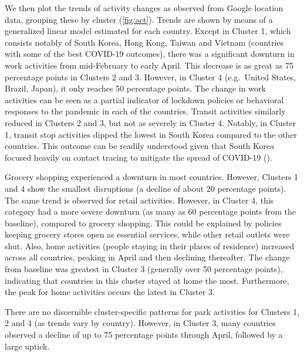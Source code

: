\documentclass[titlepage,oneside,12pt]{article}
\newcommand{\trbcite}[1]{({\it \citenum{#1}})}
\newcommand{\?}{\stackrel{?}{=}}
\begin{document}
We then plot the trends of activity changes as observed from Google location data, grouping these by cluster (\autoref{fig:act}).
Trends are shown by means of a generalized linear model estimated for each country.
Except in Cluster 1, which consists notably of South Korea, Hong Kong, Taiwan and Vietnam (countries with some of the best COVID-19 outcomes),
there was a significant downturn in work activities from mid-February to early April.
This decrease is as great as 75 percentage points in Clusters 2 and 3.
However, in Cluster 4 (e.g.\ United States, Brazil, Japan), it only reaches 50 percentage points.
The change in work activities can be seen as a partial indicator of lockdown policies or behavioral responses to the pandemic in each of the countries.
Transit activities similarly reduced in Clusters 2 and 3, but not as severely in Cluster 4.
Notably, in Cluster 1, transit stop activities dipped the lowest in South Korea compared to the other countries.
This outcome can be readily understood given that South Korea focused heavily on contact tracing to mitigate the spread of COVID-19 \trbcite{aum2020covid19,parkearly}.

Grocery shopping experienced a downturn in most countries. However, Clusters 1 and 4 show the smallest disruptions (a decline of about 20 percentage points).
The same trend is observed for retail activities.
However, in Cluster 4, this category had a more severe downturn (as many as 60 percentage points from the baseline), compared to grocery shopping.
This could be explained by policies keeping grocery stores open as essential services, while other retail outlets were shut.
Also, home activities (people staying in their places of residence) increased across all countries, peaking in April and then declining thereafter.
The change from baseline was greatest in Cluster 3 (generally over 50 percentage points), indicating that countries in this cluster stayed at home the most.
Furthermore, the peak for home activities occurs the latest in Cluster 3.

There are no discernible cluster-specific patterns for park activities for Clusters 1, 2 and 4 (as trends vary by country).
However, in Cluster 3, many countries observed a decline of up to 75 percentage points through April, followed by a large uptick.
\end{document}
